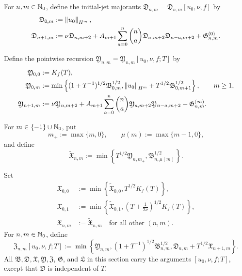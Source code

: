 \begin{definition}
For \(n,m\in\mathbb N_0\), define the initial-jet majorants
\(\mathfrak D_{n,m}=\mathfrak D_{n,m}[u_0,\nu,f]\) by
\begin{align}
 \mathfrak D_{0,m}&:=\left\lVert u_0\right\rVert_{H^m},
 \label{f:eq:qc-D0}\\
 \mathfrak D_{n+1,m}
 &:=\nu\mathfrak D_{n,m+2}
 +A_{m+1}\sum_{a=0}^{n}\binom na
   \mathfrak D_{a,m+2}\mathfrak D_{n-a,m+2}
  +\mathfrak G^{(0)}_{n,m}.
 \label{f:eq:qc-Drec}
\end{align}
\begin{samepage}
Define the pointwise recursion
\(\mathfrak Y_{n,m}=\mathfrak Y_{n,m}[u_0,\nu,f;T]\) by
\begin{align}
 \mathfrak Y_{0,0}&:=K_f(T),
 \label{f:eq:qc-Y00}\\
 \mathfrak Y_{0,m}
 &:=\min\left\{
 (1+T^{-1})^{1/2}\mathfrak B_{0,m}^{1/2},
 \left\lVert u_0\right\rVert_{H^m}+T^{1/2}\mathfrak B_{0,m+1}^{1/2}
 \right\},
 \qquad m\ge1,
 \label{f:eq:qc-Y0}\\
 \mathfrak Y_{n+1,m}
 &:=\nu\mathfrak Y_{n,m+2}
 +A_{m+1}\sum_{a=0}^{n}\binom na
 \mathfrak Y_{a,m+2}\mathfrak Y_{n-a,m+2}
 +\mathfrak G^{(\infty)}_{n,m}.
 \label{f:eq:qc-Yrec}
\end{align}
\end{samepage}
\begin{samepage}
For \(m\in\{-1\}\cup\mathbb N_0\), put
\[
 m_+:=\max\{m,0\},
 \qquad
 \mu(m):=\max\{m-1,0\},
\]
and define
\begin{equation}
 \widetilde{\mathfrak X}_{n,m}
 :=\min\left\{
 T^{1/2}\mathfrak Y_{n,m_+},
 \mathfrak B_{n,\mu(m)}^{1/2}
 \right\}.
 \label{f:eq:qc-Xraw}
\end{equation}
\end{samepage}
Set
\begin{align}
 \mathfrak X_{0,0}
 &:=\min\left\{\widetilde{\mathfrak X}_{0,0},
 T^{1/2}K_f(T)\right\},
 \label{f:eq:qc-X00}\\
 \mathfrak X_{0,1}
 &:=\min\left\{\widetilde{\mathfrak X}_{0,1},
 \left(T+\frac1{2\nu}\right)^{1/2}K_f(T)\right\},
 \label{f:eq:qc-X01}\\
 \mathfrak X_{n,m}&:=\widetilde{\mathfrak X}_{n,m}
 \quad\text{for all other }(n,m).
 \label{f:eq:qc-Xotherwise}
\end{align}
For \(n,m\in\mathbb N_0\), define
\begin{equation}
 \mathfrak Z_{n,m}[u_0,\nu,f;T]
 :=\min\left\{
 \mathfrak Y_{n,m},
 (1+T^{-1})^{1/2}\mathfrak B_{n,m}^{1/2},
 \mathfrak D_{n,m}+T^{1/2}\mathfrak X_{n+1,m}
 \right\}.
 \label{f:eq:qc-Z}
\end{equation}
All \(\mathfrak B,\mathfrak D,\mathfrak X,\mathfrak Y,\mathfrak Z\),
\(\mathfrak G\), and \(\mathfrak L\) in
this section carry the arguments \([u_0,\nu,f;T]\), except that
\(\mathfrak D\) is independent of \(T\).
\end{definition}

